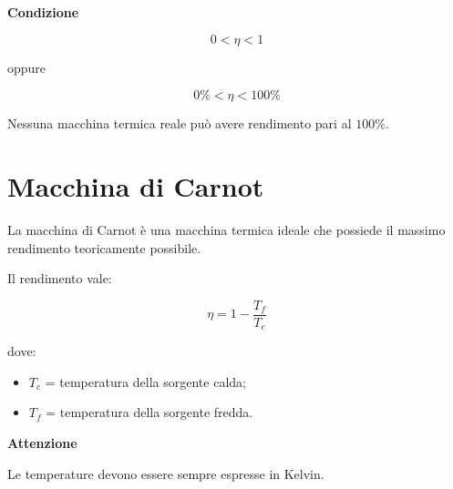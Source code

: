 \vspace{0.3cm}

\noindent\textbf{Condizione}

\[
0<\eta<1
\]

\noindent oppure

\[
0\%<\eta<100\%
\]

\vspace{0.3cm}

\noindent Nessuna macchina termica reale può avere rendimento pari al $100\%$.

\vspace{0.3cm}

\section{Macchina di Carnot}

\noindent La macchina di Carnot è una macchina termica ideale che possiede il massimo rendimento teoricamente possibile.

\vspace{0.3cm}

\noindent Il rendimento vale:

\[
\eta=1-\frac{T_f}{T_c}
\]

\noindent dove:

\begin{itemize}
    \item $T_c$ = temperatura della sorgente calda;
    \item $T_f$ = temperatura della sorgente fredda.
\end{itemize}

\vspace{0.3cm}

\noindent\textbf{Attenzione}

\noindent Le temperature devono essere sempre espresse in Kelvin.

